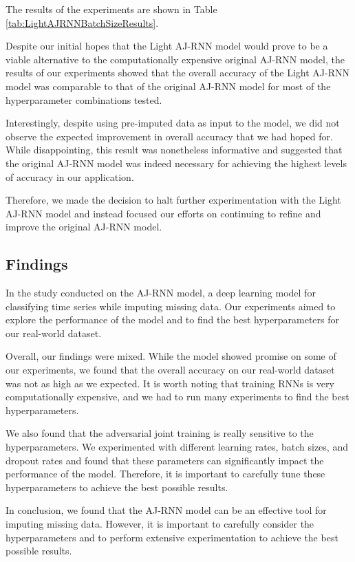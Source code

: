 The results of the experiments are shown in Table \ref{tab:LightAJRNNBatchSizeResults}.

Despite our initial hopes that the Light AJ-RNN model would prove to be a viable alternative to the computationally expensive original AJ-RNN model, the results of our experiments showed that the overall accuracy of the Light AJ-RNN model was comparable to that of the original AJ-RNN model for most of the hyperparameter combinations tested.

Interestingly, despite using pre-imputed data as input to the model, we did not observe the expected improvement in overall accuracy that we had hoped for. 
While disappointing, this result was nonetheless informative and suggested that the original AJ-RNN model was indeed necessary for achieving the highest levels of accuracy in our application.

Therefore, we made the decision to halt further experimentation with the Light AJ-RNN model and instead focused our efforts on continuing to refine and improve the original AJ-RNN model. 


\subsection{Findings}

In the study conducted on the AJ-RNN model, a deep learning model for classifying time series while imputing missing data.
Our experiments aimed to explore the performance of the model and to find the best hyperparameters for our real-world dataset.

Overall, our findings were mixed. 
While the model showed promise on some of our experiments, we found that the overall accuracy on our real-world dataset was not as high as we expected.
It is worth noting that training RNNs is very computationally expensive, and we had to run many experiments to find the best hyperparameters.

We also found that the adversarial joint training is really sensitive to the hyperparameters.
We experimented with different learning rates, batch sizes, and dropout rates and found that these parameters can significantly impact the performance of the model.
Therefore, it is important to carefully tune these hyperparameters to achieve the best possible results.

In conclusion, we found that the AJ-RNN model can be an effective tool for imputing missing data. 
However, it is important to carefully consider the hyperparameters and to perform extensive experimentation to achieve the best possible results.

